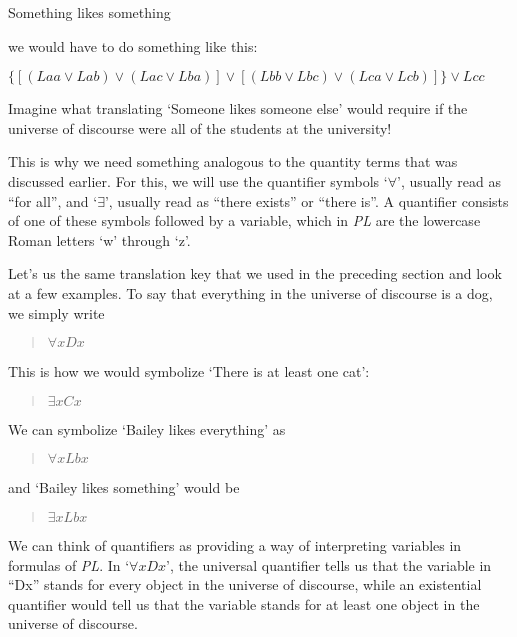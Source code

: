 \documentclass[../logic-text.tex]{subfiles}
\begin{document}
\medskip

Something likes something

\medskip

\noindent we would have to do something like this:

\medskip

\(\{[(Laa \lor Lab) \lor (Lac \lor Lba)] \lor [(Lbb \lor Lbc) \lor (Lca \lor Lcb)]\} \lor Lcc\)

\medskip

\noindent Imagine what translating \enquote*{Someone likes someone else} would require if the universe of discourse were all of the students at the university!

This is why we need something analogous to the quantity terms that was discussed earlier.
For this, we will use the quantifier symbols \enquote*{\(\forall\)}, usually read as \enquote{for all}, and \enquote*{\(\exists\)}, usually read as \enquote{there exists} or \enquote{there is}.
A quantifier consists of one of these symbols followed by a variable, which in \emph{PL} are the lowercase Roman letters \enquote*{w} through \enquote*{z}.


Let's us the same translation key that we used in the preceding section and look at a few examples.
To say that everything in the universe of discourse is a dog, we simply write

\begin{quote}
  \(\forall x   Dx \)
\end{quote}

\noindent This is how we would symbolize \enquote*{There is at least one cat}:

\begin{quote}
  \(\exists xCx \)
\end{quote}

\noindent We can symbolize \enquote*{Bailey likes everything} as

\begin{quote}
  \(\forall x   Lbx \)
\end{quote}

\noindent and \enquote*{Bailey likes something} would be

\begin{quote}
  \(\exists x   Lbx \)
\end{quote}

We can think of quantifiers as providing a way of interpreting variables in formulas of \emph{PL}.
In \enquote*{\(\forall  xDx \)}, the universal quantifier tells us that the variable in \enquote{Dx}  stands for every object in the universe of discourse, while an existential quantifier would tell us that the variable stands for at least one object in the universe of discourse.
\end{document}
